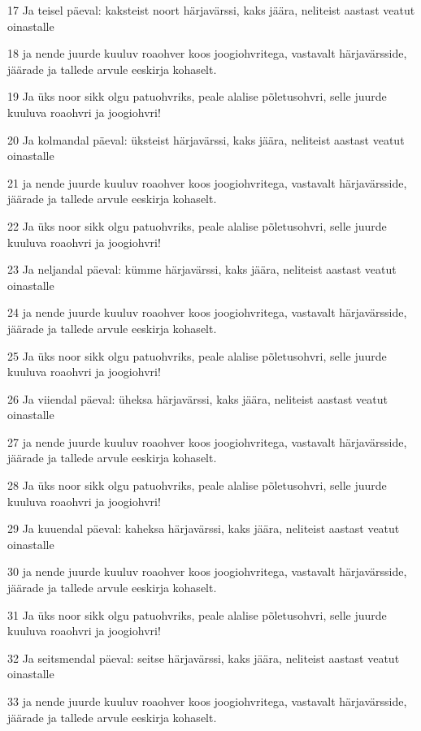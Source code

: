 \par 17 Ja teisel päeval: kaksteist noort härjavärssi, kaks jäära, neliteist aastast veatut oinastalle
\par 18 ja nende juurde kuuluv roaohver koos joogiohvritega, vastavalt härjavärsside, jäärade ja tallede arvule eeskirja kohaselt.
\par 19 Ja üks noor sikk olgu patuohvriks, peale alalise põletusohvri, selle juurde kuuluva roaohvri ja joogiohvri!
\par 20 Ja kolmandal päeval: üksteist härjavärssi, kaks jäära, neliteist aastast veatut oinastalle
\par 21 ja nende juurde kuuluv roaohver koos joogiohvritega, vastavalt härjavärsside, jäärade ja tallede arvule eeskirja kohaselt.
\par 22 Ja üks noor sikk olgu patuohvriks, peale alalise põletusohvri, selle juurde kuuluva roaohvri ja joogiohvri!
\par 23 Ja neljandal päeval: kümme härjavärssi, kaks jäära, neliteist aastast veatut oinastalle
\par 24 ja nende juurde kuuluv roaohver koos joogiohvritega, vastavalt härjavärsside, jäärade ja tallede arvule eeskirja kohaselt.
\par 25 Ja üks noor sikk olgu patuohvriks, peale alalise põletusohvri, selle juurde kuuluva roaohvri ja joogiohvri!
\par 26 Ja viiendal päeval: üheksa härjavärssi, kaks jäära, neliteist aastast veatut oinastalle
\par 27 ja nende juurde kuuluv roaohver koos joogiohvritega, vastavalt härjavärsside, jäärade ja tallede arvule eeskirja kohaselt.
\par 28 Ja üks noor sikk olgu patuohvriks, peale alalise põletusohvri, selle juurde kuuluva roaohvri ja joogiohvri!
\par 29 Ja kuuendal päeval: kaheksa härjavärssi, kaks jäära, neliteist aastast veatut oinastalle
\par 30 ja nende juurde kuuluv roaohver koos joogiohvritega, vastavalt härjavärsside, jäärade ja tallede arvule eeskirja kohaselt.
\par 31 Ja üks noor sikk olgu patuohvriks, peale alalise põletusohvri, selle juurde kuuluva roaohvri ja joogiohvri!
\par 32 Ja seitsmendal päeval: seitse härjavärssi, kaks jäära, neliteist aastast veatut oinastalle
\par 33 ja nende juurde kuuluv roaohver koos joogiohvritega, vastavalt härjavärsside, jäärade ja tallede arvule eeskirja kohaselt.
